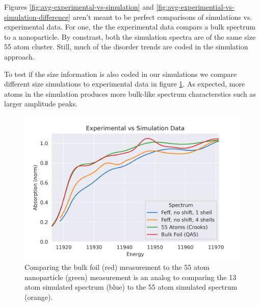 Figures \ref{fig:avg-experimental-vs-simulation} and \ref{fig:avg-experimential-vs-simulation-difference} aren't meant to be perfect comparisons of simulations vs. experimental data. For one, the the experimental data compars a bulk spectrum to a nanoparticle. By constrast, both the simulation spectra are of the same size 55 atom cluster. Still, much of the disorder trends are coded in the simulation approach. 

To test if the size information is also coded in our simulations we compare different size simulations to experimental data in figure \ref{fig:avg-experimental-vs-simulation2}. As expected, more atoms in the simulation produces more bulk-like spectrum characterstics such as larger amplitude peaks.

\begin{figure}[h]
	\centering
	\includegraphics[width=.7\linewidth]{Chapters/Figures/Bulk_55atom_experimental_theory_comparison.png}
	\caption[Simulation vs. Experimental 2]{Comparing the bulk foil (red) measurement to the 55 atom nanoparticle (green) measurement is an analog to comparing the 13 atom simulated spectrum (blue) to the 55 atom simulated spectrum (orange).}
	\label{fig:avg-experimental-vs-simulation2}
\end{figure}


